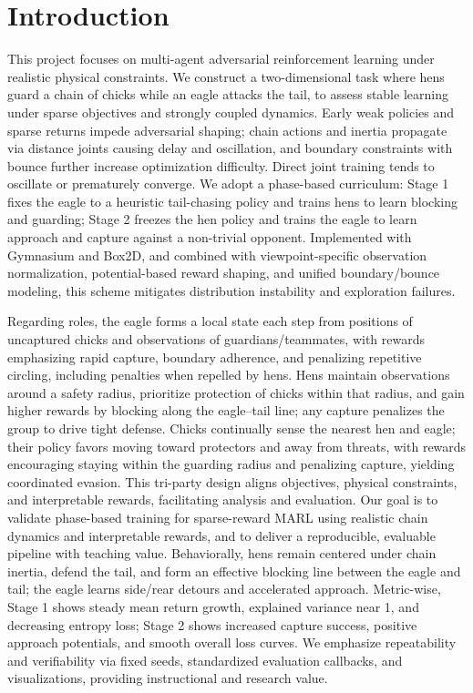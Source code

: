 \documentclass[12pt]{article}
\begin{document}
\section{Introduction}
This project focuses on multi-agent adversarial reinforcement learning under realistic physical constraints. We construct a two-dimensional task where hens guard a chain of chicks while an eagle attacks the tail, to assess stable learning under sparse objectives and strongly coupled dynamics. Early weak policies and sparse returns impede adversarial shaping; chain actions and inertia propagate via distance joints causing delay and oscillation, and boundary constraints with bounce further increase optimization difficulty. Direct joint training tends to oscillate or prematurely converge. We adopt a phase-based curriculum: Stage 1 fixes the eagle to a heuristic tail-chasing policy and trains hens to learn blocking and guarding; Stage 2 freezes the hen policy and trains the eagle to learn approach and capture against a non-trivial opponent. Implemented with Gymnasium and Box2D, and combined with viewpoint-specific observation normalization, potential-based reward shaping, and unified boundary/bounce modeling, this scheme mitigates distribution instability and exploration failures.

Regarding roles, the eagle forms a local state each step from positions of uncaptured chicks and observations of guardians/teammates, with rewards emphasizing rapid capture, boundary adherence, and penalizing repetitive circling, including penalties when repelled by hens. Hens maintain observations around a safety radius, prioritize protection of chicks within that radius, and gain higher rewards by blocking along the eagle–tail line; any capture penalizes the group to drive tight defense. Chicks continually sense the nearest hen and eagle; their policy favors moving toward protectors and away from threats, with rewards encouraging staying within the guarding radius and penalizing capture, yielding coordinated evasion. This tri-party design aligns objectives, physical constraints, and interpretable rewards, facilitating analysis and evaluation.
Our goal is to validate phase-based training for sparse-reward MARL using realistic chain dynamics and interpretable rewards, and to deliver a reproducible, evaluable pipeline with teaching value. Behaviorally, hens remain centered under chain inertia, defend the tail, and form an effective blocking line between the eagle and tail; the eagle learns side/rear detours and accelerated approach. Metric-wise, Stage 1 shows steady mean return growth, explained variance near 1, and decreasing entropy loss; Stage 2 shows increased capture success, positive approach potentials, and smooth overall loss curves. We emphasize repeatability and verifiability via fixed seeds, standardized evaluation callbacks, and visualizations, providing instructional and research value.
\end{document}
